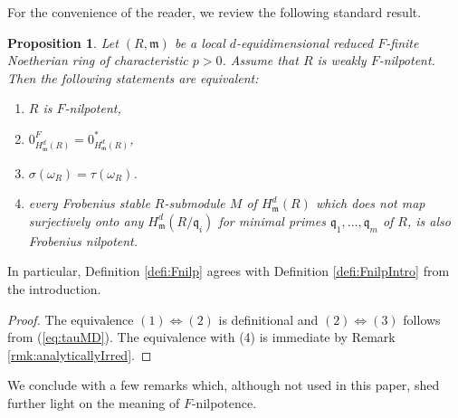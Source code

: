 \documentclass[letterpaper,11pt]{amsart}
\theoremstyle{plain}
\newtheorem{prop}[thm]{Proposition}
\theoremstyle{definition}
\theoremstyle{remark}
\def\frm{\mathfrak{m}}
\def\m{\mathfrak{m}} %
\begin{document}
For the convenience of the reader, we review the following standard result.

\begin{prop} \label{prop:EquivFNilpDef}
Let $(R,\m)$ be a local $d$-equidimensional reduced $F$-finite Noetherian ring of characteristic $p>0$. Assume that $R$ is weakly $F$-nilpotent. Then the following statements are equivalent:
\begin{enumerate} \setlength\itemsep{0.2em}
\item $R$ is $F$-nilpotent,
\item $0^F_{H^d_\m(R)} = 0^*_{H^d_\m(R)}$,
\item $\sigma(\omega_R) = \tau(\omega_R)$.
\item every Frobenius stable $R$-submodule $M$ of $H^{d}_{\frm}(R)$ which does not map surjectively onto any $H^d_\frm(R/\mathfrak{q}_i)$ for minimal primes $\mathfrak{q}_1, \ldots, \mathfrak{q}_m$ of $R$, is also Frobenius nilpotent.
\end{enumerate}
\end{prop}
\noindent In particular, Definition \ref{defi:Fnilp} agrees with Definition \ref{defi:FnilpIntro} from the introduction.
\begin{proof}
The equivalence $(1) \iff (2)$ is definitional and $(2) \iff (3)$ follows from (\ref{eq:tauMD}). The equivalence with (4) is immediate by Remark \ref{rmk:analyticallyIrred}.
\end{proof}



We conclude with a few remarks which, although not used in this paper, shed further light on the meaning of $F$-nilpotence.
\end{document}
